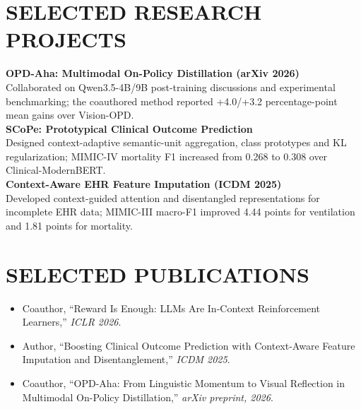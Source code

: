 \documentclass[10pt, letterpaper]{article}
\begin{document}
\section{SELECTED RESEARCH PROJECTS}
\textbf{OPD-Aha: Multimodal On-Policy Distillation (arXiv 2026)}\\[-1pt]
Collaborated on Qwen3.5-4B/9B post-training discussions and experimental benchmarking; the coauthored method reported +4.0/+3.2 percentage-point mean gains over Vision-OPD.\\[3pt]
\textbf{SCoPe: Prototypical Clinical Outcome Prediction}\\[-1pt]
Designed context-adaptive semantic-unit aggregation, class prototypes and KL regularization; MIMIC-IV mortality F1 increased from 0.268 to 0.308 over Clinical-ModernBERT.\\[3pt]
\textbf{Context-Aware EHR Feature Imputation (ICDM 2025)}\\[-1pt]
Developed context-guided attention and disentangled representations for incomplete EHR data; MIMIC-III macro-F1 improved 4.44 points for ventilation and 1.81 points for mortality.\\[3pt]
\section{SELECTED PUBLICATIONS}
\begin{itemize}
\item Coauthor, ``Reward Is Enough: LLMs Are In-Context Reinforcement Learners,'' \textit{ICLR 2026}.
\item Author, ``Boosting Clinical Outcome Prediction with Context-Aware Feature Imputation and Disentanglement,'' \textit{ICDM 2025}.
\item Coauthor, ``OPD-Aha: From Linguistic Momentum to Visual Reflection in Multimodal On-Policy Distillation,'' \textit{arXiv preprint, 2026}.
\end{itemize}
\end{document}

